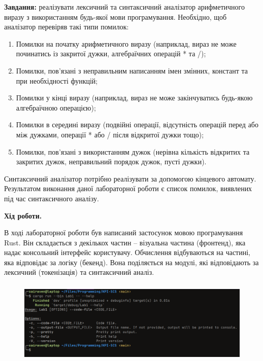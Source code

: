\documentclass[14pt, a4paper]{extreport}
\begin{document}
	\textbf{Завдання:} реалізувати лексичний та синтаксичний аналізатор арифметичного виразу з використанням будь-якої мови програмування. Необхідно, щоб аналізатор перевіряв такі типи помилок:
	\begin{enumerate}
		\item Помилки на початку арифметичного виразу (наприклад, вираз не може починатись із закритої дужки, алгебраїчних операцій * та /);
		\item Помилки, пов’язані з неправильним написанням імен змінних, констант та при необхідності функцій;
		\item Помилки у кінці виразу (наприклад, вираз не може закінчуватись будь-якою алгебраїчною операцією);
		\item Помилки в середині виразу (подвійні операції, відсутність операцій перед або між дужками, операції * або / після відкритої дужки тощо);
		\item Помилки, пов’язані з використанням дужок (нерівна кількість відкритих та закритих дужок, неправильний порядок дужок, пусті дужки).
	\end{enumerate}
	
	Синтаксичний аналізатор потрібно реалізувати за допомогою кінцевого автомату. Результатом виконання даної лабораторної роботи є список помилок, виявлених під час синтаксичного аналізу.
	
	\begin{center}
		\textbf{Хід роботи.}
	\end{center}
	
	В ході лабораторної роботи був написаний застосунок мовою програмування Rust. Він складається з декількох частин -- візуальна частина (фронтенд), яка надає консольний інтерфейс користувачу. Обчислення відбуваються на частині, яка відповідає за логіку (бекенд). Вона поділяється на модулі, які відповідають за лексичний (токенізація) та синтаксичний аналіз.
	
	\begin{figure}[H]
		\centering
		\includegraphics[height=4cm]{1} 
	\end{figure}
	
\end{document}
